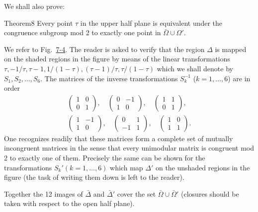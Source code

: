 We shall also prove:

\begin{originalstatement}{Theorem}{8}\label{thm:7.8}
Every point $\tau$ in the upper half plane is equivalent under the congruence subgroup mod 2 to exactly one point in $\bar{\Omega} \cup \Omega'$.
\end{originalstatement}
We refer to Fig.~\hyperref[fig:7-4]{7-4}. The reader is asked to verify that the region $\Delta$ is mapped on the shaded regions in the figure by means of the linear transformations $\tau, -1/\tau, \tau - 1, 1/(1 - \tau), (\tau - 1)/\tau, \tau/(1 - \tau)$ which we shall denote by $S_1, S_2, \ldots, S_6$. The matrices of the inverse transformations $S_k^{-1}$ ($k = 1, \ldots, 6$) are in order
\begin{equation*}
\begin{gathered}
\begin{pmatrix}1&0\\0&1\end{pmatrix},\quad
\begin{pmatrix}0&-1\\1&0\end{pmatrix},\quad
\begin{pmatrix}1&1\\0&1\end{pmatrix},\\[3pt]
\begin{pmatrix}1&-1\\1&0\end{pmatrix},\quad
\begin{pmatrix}0&1\\-1&1\end{pmatrix},\quad
\begin{pmatrix}1&0\\1&1\end{pmatrix}.
\end{gathered}
\end{equation*}
One recognizes readily that these matrices form a complete set of mutually incongruent matrices in the sense that every unimodular matrix is congruent mod 2 to exactly one of them. Precisely the same can be shown for the transformations $S_k' (k = 1, \ldots, 6)$ which map $\Delta'$ on the unshaded regions in the figure (the task of writing them down is left to the reader).


Together the 12 images of $\bar{\Delta}$ and $\bar{\Delta}'$ cover the set $\bar{\Omega} \cup \bar{\Omega}'$ (closures should be taken with respect to the open half plane).

